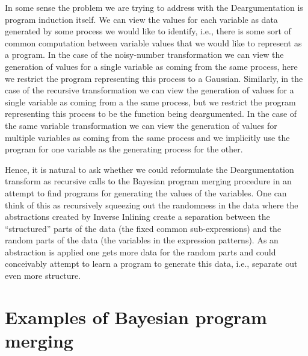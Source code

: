 \documentclass[a4paper,10pt]{article}
\begin{document}
In some sense the problem we are trying to address with the Deargumentation is program induction itself.  We can view the values for each variable as data generated by some process we would like to identify, i.e., there is some sort of common computation between variable values that we would like to represent as a program.  In the case of the noisy-number transformation we can view the generation of values for a single variable as coming from the same process, here we restrict the program representing this process to a Gaussian.  Similarly, in the case of the recursive transformation we can view the generation of values for a single variable as coming from a the same process, but we restrict the program representing this process to be the function being deargumented.  In the case of the same variable transformation we can view the generation of values for multiple variables as coming from the same process and we implicitly use the program for one variable as the generating process for the other.  

Hence, it is natural to ask whether we could reformulate the Deargumentation transform as recursive calls to the Bayesian program merging procedure in an attempt to find programs for generating the values of the variables.  One can think of this as recursively squeezing out the randomness in the data where the abstractions created by Inverse Inlining create a separation between the ``structured'' parts of the data (the fixed common sub-expressions) and the random parts of the data (the variables in the expression patterns).  As an abstraction is applied one gets more data for the random parts and could conceivably attempt to learn a program to generate this data, i.e., separate out even more structure.


\newpage
\section{Examples of Bayesian program merging}
\end{document}
